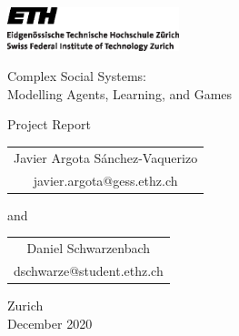 
\thispagestyle{empty}

\begin{center}
\includegraphics[width=5cm]{ETHlogo.eps}

\bigskip


\bigskip


\bigskip


\LARGE{ 	Complex Social Systems:\\ }
\LARGE{ Modelling Agents, Learning, and Games\\}

\bigskip

\bigskip

\small{Project Report}\\

\bigskip

\bigskip

\bigskip

\bigskip





\bigskip

\bigskip

\bigskip

\begin{tabular}{@{}c@{}}
\LARGE{Javier Argota Sánchez-Vaquerizo} \\
\normalsize javier.argota@gess.ethz.ch
\end{tabular}%
\quad and\quad
\begin{tabular}{@{}c@{}}
\LARGE{Daniel Schwarzenbach} \\
\normalsize dschwarze@student.ethz.ch
\end{tabular}



\bigskip

\bigskip

\bigskip

\bigskip

\bigskip

\bigskip

\bigskip

\bigskip

Zurich\\
December 2020\\

\end{center}


